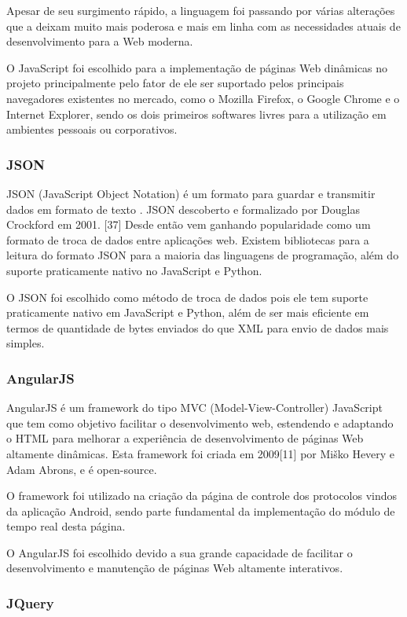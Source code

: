 \documentclass[
	article,			%
	11pt,				%
	oneside,			%
	a4paper,			%
	english,			%
	brazil,				%
	sumario=tradicional
	]{abntex2}
\begin{document}
Apesar de seu surgimento rápido, a linguagem foi passando por várias alterações
que a deixam muito mais poderosa e mais em linha com as necessidades atuais de
desenvolvimento para a Web moderna.

O JavaScript foi escolhido para a implementação de páginas Web dinâmicas no
projeto principalmente pelo fator de ele ser suportado pelos principais
navegadores existentes no mercado, como o Mozilla Firefox, o Google Chrome e o
Internet Explorer, sendo os dois primeiros softwares livres para a utilização em
ambientes pessoais ou corporativos.


\subsubsection{JSON}

JSON (JavaScript Object Notation) é um formato para guardar e transmitir dados
em formato de texto . JSON descoberto e formalizado por Douglas Crockford em
2001. [37] Desde então vem ganhando popularidade como um formato de troca de
dados entre aplicações web. Existem bibliotecas para a leitura do formato JSON
para a maioria das linguagens de programação, além do suporte praticamente
nativo no JavaScript e Python.

O JSON foi escolhido como método de troca de dados pois ele tem suporte
praticamente nativo em JavaScript e Python, além de ser mais eficiente em termos
de quantidade de bytes enviados do que XML para envio de dados mais simples.

\subsubsection{AngularJS}

AngularJS é um framework do tipo MVC (Model-View-Controller) JavaScript que
tem como objetivo facilitar o desenvolvimento web, estendendo e adaptando o
HTML para melhorar a experiência de desenvolvimento de páginas Web altamente
dinâmicas. Esta framework foi criada em 2009[11] por  Miško Hevery e Adam
Abrons, e é open-source.

O framework foi utilizado na criação da página de controle dos protocolos
vindos da aplicação Android, sendo parte fundamental da implementação do módulo
de tempo real desta página.

O AngularJS foi escolhido devido a sua grande capacidade de facilitar o
desenvolvimento e manutenção de páginas Web altamente interativos.

\subsubsection{JQuery}
\end{document}
